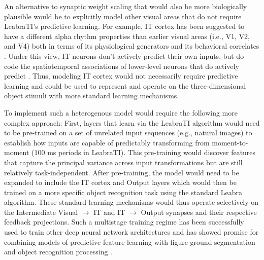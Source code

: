 \documentclass[dwyatte_dissertation.tex]{subfiles}
\begin{document}
An alternative to synaptic weight scaling that would also be more biologically plausible would be to explicitly model other visual areas that do not require LeabraTI's predictive learning. For example, IT cortex has been suggested to have a different alpha rhythm properties than earlier visual areas (i.e., V1, V2, and V4) both in terms of its physiological generators and its behavioral correlates \cite{BollimuntaChenSchroederEtAl08}. Under this view, IT neurons don't actively predict their own inputs, but do code the spatiotemporal associations of lower-level neurons that do actively predict \cite{CoxMeierOerteltEtAl05,LiDiCarlo08,LiDiCarlo10,LiDiCarlo12}. Thus, modeling IT cortex would not necessarily require predictive learning and could be used to represent and operate on the three-dimensional object stimuli with more standard learning mechanisms. 

To implement such a heterogenous model would require the following more complex approach: First, layers that learn via the LeabraTI algorithm would need to be pre-trained on a set of unrelated input sequences (e.g., natural images) to establish how inputs are capable of predictably transforming from moment-to-moment (100 ms periods in LeabraTI). This pre-training would discover features that capture the principal variance across input transformations but are still relatively task-independent. After pre-training, the model would need to be expanded to include the IT cortex and Output layers which would then be trained on a more specific object recognition task using the standard Leabra algorithm.  These standard learning mechanisms would thus operate selectively on the Intermediate Visual $\rightarrow$ IT and IT $\rightarrow$ Output synapses and their respective feedback projections. Such a multistage training regime has been successfully used to train other deep neural network architectures \cite{HintonSalakhutdinov06} and has showed promise for combining models of predictive feature learning with figure-ground segmentation and object recognition processing \cite{OReillyWyatteRohrlichEtAlInPrep}.

%
\end{document}

